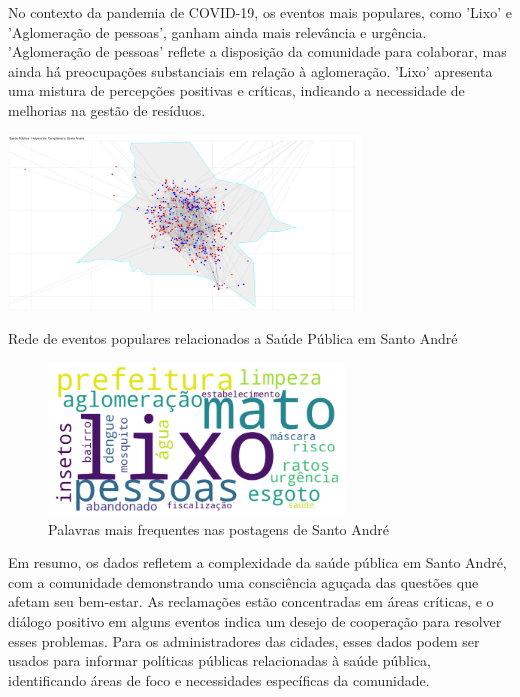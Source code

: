 No contexto da pandemia de COVID-19, os eventos mais populares, como 'Lixo' e 'Aglomeração de pessoas', ganham ainda mais relevância e urgência. 'Aglomeração de pessoas' reflete a disposição da comunidade para colaborar, mas ainda há preocupações substanciais em relação à aglomeração. 'Lixo' apresenta uma mistura de percepções positivas e críticas, indicando a necessidade de melhorias na gestão de resíduos.

\begin{quadro}[htb]
	\centering
	\includegraphics[width=0.7\textwidth]{images/network_santo_andre_personas_map.png}
	\caption{Rede de eventos populares relacionados a Saúde Pública em Santo André}
	\label{fig:network_santo_andre_personas_map}
\end{quadro}

\begin{figure}[htb]
	\centering
	\includegraphics[width=0.7\textwidth]{images/wordcloud_santo_andre.png}
	\caption{Palavras mais frequentes nas postagens de Santo André}
	\label{fig:wordcloud_santo_andre}
\end{figure}

Em resumo, os dados refletem a complexidade da saúde pública em Santo André, com a comunidade demonstrando uma consciência aguçada das questões que afetam seu bem-estar. As reclamações estão concentradas em áreas críticas, e o diálogo positivo em alguns eventos indica um desejo de cooperação para resolver esses problemas. Para os administradores das cidades, esses dados podem ser usados para informar políticas públicas relacionadas à saúde pública, identificando áreas de foco e necessidades específicas da comunidade.


